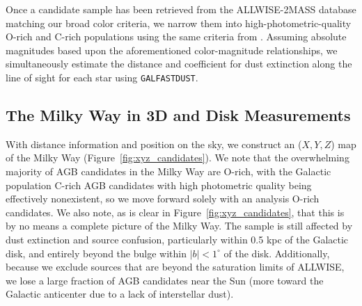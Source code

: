 Once a candidate sample has been retrieved from the ALLWISE-2MASS database matching our broad color criteria, we narrow them into high-photometric-quality O-rich and C-rich populations using the same criteria from \cite{2014MNRAS.442.3361N}. Assuming absolute magnitudes based upon the aforementioned color-magnitude relationships, we simultaneously estimate the distance and coefficient for dust extinction along the line of sight for each star using {\tt GALFASTDUST}.

\subsection{The Milky Way in 3D and Disk Measurements}
With distance information and position on the sky, we construct an ($X,Y,Z $) map of the Milky Way (Figure~\ref{fig:xyz_candidates}). We note that the overwhelming majority of AGB candidates in the Milky Way are O-rich, with the Galactic population C-rich AGB candidates with high photometric quality being effectively nonexistent, so we move forward solely with an analysis O-rich candidates. We also note, as is clear in Figure~\ref{fig:xyz_candidates}, that this is by no means a complete picture of the Milky Way. The sample is still affected by dust extinction and source confusion, particularly within 0.5 kpc of the Galactic disk, and entirely beyond the bulge within $|b| < 1^\circ$ of the disk. Additionally, because we exclude sources that are beyond the saturation limits of ALLWISE, we lose a large fraction of AGB candidates near the Sun (more toward the Galactic anticenter due to a lack of interstellar dust).

